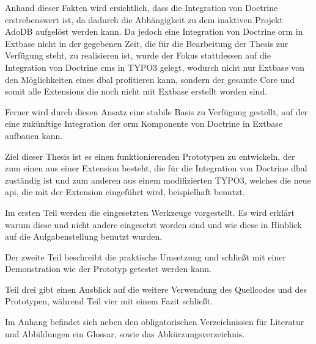 Anhand dieser Fakten wird ersichtlich, dass die Integration von Doctrine erstrebenswert ist, da dadurch die Abhängigkeit zu dem inaktiven Projekt AdoDB aufgelöst werden kann. Da jedoch eine Integration von Doctrine \gls{orm} in Extbase nicht in der gegebenen Zeit, die für die Bearbeitung der Thesis zur Verfügung steht, zu realisieren ist, wurde der Fokus stattdessen auf die Integration von Doctrine \gls{cms} in TYPO3 gelegt, wodurch nicht nur Extbase von den Möglichkeiten eines \gls{dbal} profitieren kann, sondern der gesamte Core und somit alle Extensions die noch nicht mit Extbase erstellt worden sind.

Ferner wird durch diesen Ansatz eine stabile Basis zu Verfügung gestellt, auf der eine zukünftige Integration der \gls{orm} Komponente von Doctrine in Extbase aufbauen kann.

Ziel dieser Thesis ist es einen funktionierenden Prototypen zu entwickeln, der zum einen aus einer Extension besteht, die für die Integration von Doctrine \gls{dbal} zuständig ist und zum anderen aus einem modifizierten TYPO3, welches die neue \gls{api}, die mit der Extension eingeführt wird, beispielhaft benutzt.

Im ersten Teil werden die eingesetzten Werkzeuge vorgestellt. Es wird erklärt warum diese und nicht andere eingesetzt worden sind und wie diese in Hinblick auf die Aufgabenstellung benutzt wurden.

Der zweite Teil beschreibt die praktische Umsetzung und schließt mit einer Demonstration wie der Prototyp getestet werden kann.

Teil drei gibt einen Ausblick auf die weitere Verwendung des Quellcodes und des Prototypen, während Teil vier mit einem Fazit schließt.

Im Anhang befindet sich neben den obligatorischen Verzeichnissen für Literatur und Abbildungen ein Glossar, sowie das Abkürzungsverzeichnis.

